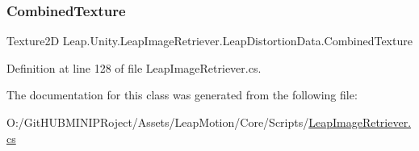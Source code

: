 \subsubsection{\texorpdfstring{CombinedTexture}{CombinedTexture}}
{\footnotesize\ttfamily Texture2D Leap.\+Unity.\+Leap\+Image\+Retriever.\+Leap\+Distortion\+Data.\+Combined\+Texture\hspace{0.3cm}{\ttfamily [get]}}



Definition at line 128 of file Leap\+Image\+Retriever.\+cs.



The documentation for this class was generated from the following file\+:\begin{DoxyCompactItemize}
\item 
O\+:/\+Git\+H\+U\+B\+M\+I\+N\+I\+P\+Roject/\+Assets/\+Leap\+Motion/\+Core/\+Scripts/\mbox{\hyperlink{_leap_image_retriever_8cs}{Leap\+Image\+Retriever.\+cs}}\end{DoxyCompactItemize}
